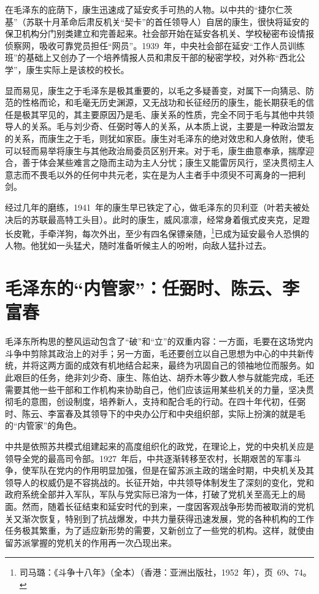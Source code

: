 在毛泽东的庇荫下，康生迅速成了延安炙手可热的人物。以中共的“捷尔仁茨基”（苏联十月革命后肃反机关“契卡”的首任领导人）自居的康生，很快将延安的保卫机构分门别类建立和完善起来。社会部开始在延安各机关、学校秘密布设情报侦察网，吸收可靠党员担任“网员”。1939~年，中央社会部在延安“工作人员训练班”的基础上又创办了一个培养情报人员和肃反干部的秘密学校，对外称“西北公学”，康生实际上是该校的校长。

显而易见，康生之于毛泽东是极其重要的，以毛之多疑善变，对属下一向猜忌、防范的性格而论，和毛毫无历史渊源，又无战功和长征经历的康生，能长期获毛的信任是极其罕见的，其主要原因乃是毛、康关系的性质，完全不同于毛与其他中共领导人的关系。毛与刘少奇、任弼时等人的关系，从本质上说，主要是一种政治盟友的关系，而康生之于毛，则犹如家臣。康生对毛泽东的绝对效忠和人身依附，使毛可以轻而易举将康生与其他政治局委员区别开来。对于毛，康生曲意奉承，揣摩迎合，善于体会某些难言之隐而主动为主人分忧；康生又能雷厉风行，坚决贯彻主人意志而不畏毛以外的任何中共元老，实在是为人主者手中须臾不可离身的一把利剑。

经过几年的磨练，1941~年的康生早已铁定了心，做毛泽东的贝利亚（叶若夫被处决后的苏联最高特工头目）。此时的康生，威风凛凛，经常身着俄式皮夹克，足蹬长皮靴，手牵洋狗，每次外出，至少有四名保镖亲随，\footnote{司马璐：《斗争十八年》（全本）（香港：亚洲出版社，1952~年），页~69、74。}已成为延安最令人恐惧的人物。他犹如一头猛犬，随时准备听候主人的吩咐，向敌人猛扑过去。

\section{毛泽东的“内管家”：任弼时、陈云、李富春}

毛泽东所构思的整风运动包含了“破”和“立”的双重内容：一方面，毛要在这场党内斗争中剪除其政治上的对手；另一方面，毛还要创立以自己思想为中心的中共新传统，并将这两方面的成效有机地结合起来，最终为巩固自己的领袖地位而服务。如此艰巨的任务，绝非刘少奇、康生、陈伯达、胡乔木等少数人参与就能完成，毛还需要其他一些干部和工作机构来协助自己，他们应该运用某些机关的力量，坚决贯彻毛的意图，创设制度，培养新人，支持和配合毛的行动。在四十年代初，任弼时、陈云、李富春及其领导下的中央办公厅和中央组织部，实际上扮演的就是毛的“内管家”的角色。

中共是依照苏共模式组建起来的高度组织化的政党，在理论上，党的中央机关应是领导全党的最高司令部。1927~年后，中共逐渐转移至农村，长期艰苦的军事斗争，使军队在党内的作用明显加强，但是在留苏派主政的瑞金时期，中央机关及其领导人的权威仍是不容挑战的。长征开始，中共领导体制发生了深刻的变化，党和政府系统全部并入军队，军队与党实际已溶为一体，打破了党机关至高无上的局面。然而，随着长征结束和延安时代的到来，一度因客观战争形势而被取消的党机关又渐次恢复，特别到了抗战爆发，中共力量获得迅速发展，党的各种机构的工作任务极其繁重，为了适应新形势的需要，又新创立了一些党的机构。这样，就使由留苏派掌握的党机关的作用再一次凸现出来。

